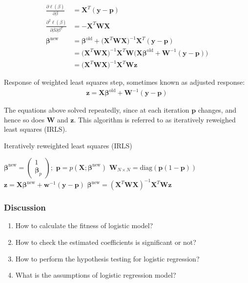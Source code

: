 \documentclass[12pt,a4paper]{article}%
\theoremstyle{definition}
\theoremstyle{plain}
\numberwithin{equation}{section}
\begin{document}
\begin{align*}
\frac{\partial \ell(\beta)}{\partial \beta} & = \mathbf{X}^{T}(\mathbf{y}-\mathbf{p}) \\
\frac{\partial^{2} \ell(\beta)}{\partial \beta \partial \beta^{T}}  & = -\mathbf{X}^{T} \mathbf{W} \mathbf{X} \\
\boldsymbol{\beta}^{\text{new}} &= \boldsymbol{\beta}^{\text{old}} + \big( \mathbf{X}^{T} \mathbf{W} \mathbf{X} \big)^{-1} \mathbf{X}^{T}(\mathbf{y}-\mathbf{p}) \\
 & = \big( \mathbf{X}^{T} \mathbf{W} \mathbf{X} \big)^{-1} \mathbf{X}^{T} \mathbf{W} \big( \mathbf{X} \boldsymbol{\beta}^{\text{old}} +  \mathbf{W}^{-1}(\mathbf{y}-\mathbf{p})\big) \\
 & = \big( \mathbf{X}^{T} \mathbf{W} \mathbf{X} \big)^{-1} \mathbf{X}^{T} \mathbf{W} \mathbf{z}
\end{align*}

Response of weighted least squares step, sometimes known as adjusted response:
\begin{gather}
\mathbf{z} = \mathbf{X} \boldsymbol{\beta}^{\text{old}} +  \mathbf{W}^{-1}(\mathbf{y}-\mathbf{p})
\end{gather}

The equations above solved repeatedly, since at each iteration $\mathbf{p}$ changes, and hence so does $\mathbf{W}$ and $\mathbf{z}$.
This algorithm is referred to as iteratively reweighed least squares (IRLS).

\begin{algorithm}[H]
\caption{Iteratively reweighted least squares (IRLS)}\label{euclid}
\begin{algorithmic}[1]
\State $\boldsymbol{\beta}^{\text{new}} =  \begin{pmatrix}  1 \\ \boldsymbol{\mathbf{\beta}}_{p}  \end{pmatrix} ;$
\Repeat
\State $\mathbf{p} = p(\mathbf{X};\boldsymbol{\beta}^{\text{new}})$
\State $\mathbf{W}_{N \times N} = \text{diag}(\mathbf{p} (1-\mathbf{p}))$
\State $\mathbf{z} = \mathbf{X}\boldsymbol{\beta}^{\text{new}}+ \mathbf{w}^{-1}(\mathbf{y}-\mathbf{p})$
\State $\boldsymbol{\beta}^{\text{new}} = (\mathbf{X}^{T} \mathbf{W} \mathbf{X})^{-1} \mathbf{X}^{T} \mathbf{W} \mathbf{z} $
\end{algorithmic}
\end{algorithm}

\subsubsection{Discussion}
\begin{enumerate}
\item How to calculate the fitness of logistic model?
\item How to check the estimated coefficients is significant or not?
\item How to perform the hypothesis testing for logistic regression? 
\item What is the assumptions of logistic regression model?
\end{enumerate}
\end{document}
